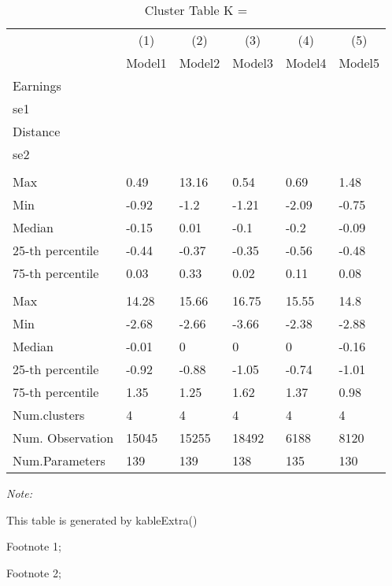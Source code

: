 \begin{table}
\centering
\caption{Cluster Table K = }
\centering
\begin{threeparttable}
\begin{tabular}[t]{llllll}
\toprule
\multicolumn{1}{c}{ } & \multicolumn{1}{c}{(1)} & \multicolumn{1}{c}{(2)} & \multicolumn{1}{c}{(3)} & \multicolumn{1}{c}{(4)} & \multicolumn{1}{c}{(5)} \\
\cmidrule(l{3pt}r{3pt}){2-2} \cmidrule(l{3pt}r{3pt}){3-3} \cmidrule(l{3pt}r{3pt}){4-4} \cmidrule(l{3pt}r{3pt}){5-5} \cmidrule(l{3pt}r{3pt}){6-6}
 & Model1 & Model2 & Model3 & Model4 & Model5\\
\midrule
Earnings &  &  &  &  & \\
se1 &  &  &  &  & \\
Distance &  &  &  &  & \\
se2 &  &  &  &  & \\
\addlinespace[0.3em]
\multicolumn{6}{l}{\textit{\textbf{Panel A: }}}\\
\hspace{1em}Max & 0.49 & 13.16 & 0.54 & 0.69 & 1.48\\
\hspace{1em}Min & -0.92 & -1.2 & -1.21 & -2.09 & -0.75\\
\hspace{1em}Median & -0.15 & 0.01 & -0.1 & -0.2 & -0.09\\
\hspace{1em}25-th percentile & -0.44 & -0.37 & -0.35 & -0.56 & -0.48\\
\hspace{1em}75-th percentile & 0.03 & 0.33 & 0.02 & 0.11 & 0.08\\
\addlinespace[0.3em]
\multicolumn{6}{l}{\textit{\textbf{Panel B: }}}\\
\hspace{1em}Max & 14.28 & 15.66 & 16.75 & 15.55 & 14.8\\
\hspace{1em}Min & -2.68 & -2.66 & -3.66 & -2.38 & -2.88\\
\hspace{1em}Median & -0.01 & 0 & 0 & 0 & -0.16\\
\hspace{1em}25-th percentile & -0.92 & -0.88 & -1.05 & -0.74 & -1.01\\
\hspace{1em}75-th percentile & 1.35 & 1.25 & 1.62 & 1.37 & 0.98\\
Num.clusters & 4 & 4 & 4 & 4 & 4\\
Num. Observation & 15045 & 15255 & 18492 & 6188 & 8120\\
Num.Parameters & 139 & 139 & 138 & 135 & 130\\
\bottomrule
\end{tabular}
\begin{tablenotes}
\item \textit{Note: } 
\item This table is generated by kableExtra()
\item[1] Footnote 1; 
\item[2] Footnote 2; 
\end{tablenotes}
\end{threeparttable}
\end{table}
